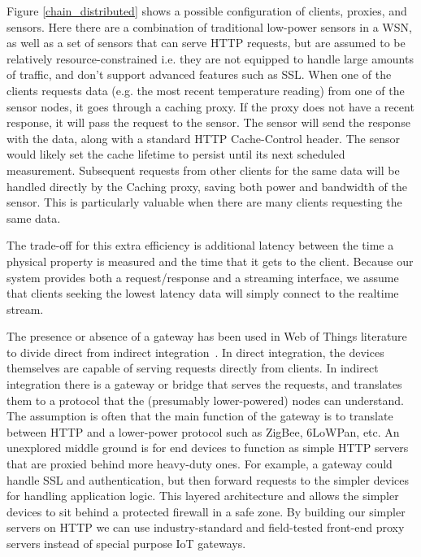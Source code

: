 \documentclass{acm_proc_article-sp}
\begin{document}
Figure \ref{chain_distributed} shows a possible configuration of clients,
proxies, and sensors. Here there are a combination of traditional low-power
sensors in a WSN, as well as a set of sensors that
can serve HTTP requests, but are assumed to be relatively resource-constrained
i.e.  they are not equipped to handle large amounts of traffic, and don't
support advanced features such as SSL. When one of the clients requests data
(e.g. the most recent temperature reading) from one of the sensor nodes, it
goes through a caching proxy. If the proxy does not have a recent response, it
will pass the request to the sensor. The sensor will send the response with the
data, along with a standard HTTP Cache-Control header. The sensor would likely
set the cache lifetime to persist until its next scheduled measurement.
Subsequent requests from other clients for the same data will be handled
directly by the Caching proxy, saving both power and bandwidth of the sensor.
This is particularly valuable when there are many clients requesting the same
data.

The trade-off for this extra efficiency is additional latency between the time
a physical property is measured and the time that it gets to the client.
Because our system provides both a request/response and a streaming interface,
we assume that clients seeking the lowest latency data will simply connect to
the realtime stream.

The presence or absence of a gateway has been used in Web of Things literature
to divide direct from indirect integration~\cite{wotsurvey}. In direct
integration, the devices themselves are capable of serving requests directly
from clients. In indirect integration there is a gateway or bridge that serves
the requests, and translates them to a protocol that the (presumably
lower-powered) nodes can understand. The assumption is often that the main
function of the gateway is to translate between HTTP and a lower-power protocol
such as ZigBee, 6LoWPan, etc. An unexplored middle ground is for end devices to
function as simple HTTP servers that are proxied behind more heavy-duty ones.
For example, a gateway could handle SSL and authentication, but then forward
requests to the simpler devices for handling application logic. This layered
architecture  and allows the simpler devices to sit behind a protected firewall
in a safe zone. By building our simpler servers on HTTP we can use
industry-standard and field-tested front-end proxy servers instead of special
purpose IoT gateways.
\end{document}
